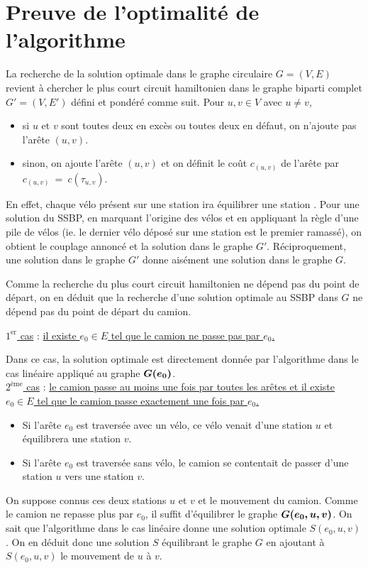 \section{Preuve de l'optimalité de l'algorithme}
\label{Capicité unitaire preuve}

La recherche de la solution optimale dans le graphe circulaire $G=(V,E)$ revient à chercher le plus court circuit hamiltonien dans le graphe biparti complet $G'=(V,E')$ défini et pondéré comme suit. Pour $u,v \in V$ avec $u \ne v$,
\begin{itemize}
\item si $u$ et $v$ sont toutes deux en excès ou toutes deux en défaut, on n'ajoute pas l'arête $(u,v)$.
\item sinon, on ajoute l'arête $(u,v)$ et on définit le coût $c_{(u,v)}$ de l'arête par $c_{(u,v)}~=~c(\tau_{u,v})$.
\end{itemize}
En effet, chaque vélo présent sur une station \plus ira équilibrer une station \moins. Pour une solution du SSBP, en marquant l'origine des vélos et en appliquant la règle d'une pile de vélos (ie. le dernier vélo déposé sur une station est le premier ramassé), on obtient le couplage annoncé et la solution dans le graphe $G'$. Réciproquement, une solution dans le graphe $G'$ donne aisément une solution dans le graphe $G$.

Comme la recherche du plus court circuit hamiltonien ne dépend pas du point de départ, on en déduit que la recherche d'une solution optimale au SSBP dans $G$ ne dépend pas du point de départ du camion.

\uline{$1^{\mbox{er}}$ cas} : \uline{il existe $e_0 \in E$ tel que le camion ne passe pas par $e_0$.}

Dans ce cas, la solution optimale est directement donnée par l'algorithme dans le cas linéaire appliqué au graphe $\boldsymbol{G(e_0)}$.
\\

\uline{$2^{\mbox{ème}}$ cas} : \uline{le camion passe au moins une fois par toutes les arêtes et il existe $e_0 \in E$ tel que le camion passe exactement une fois par $e_0$.}

\begin{itemize}
\item Si l'arête $e_0$ est traversée avec un vélo, ce vélo venait d'une station \plus $u$ et équilibrera une station \moins $v$.
\item Si l'arête $e_0$ est traversée sans vélo, le camion se contentait de passer d'une station \moins $u$ vers une station \plus $v$.
\end{itemize}
On suppose connus ces deux stations $u$ et $v$ et le mouvement du camion. Comme le camion ne repasse plus par $e_0$, il suffit d'équilibrer le graphe $\boldsymbol{G(e_0,u,v)}$. On sait que l'algorithme dans le cas linéaire donne une solution optimale $S(e_0,u,v)$. On en déduit donc une solution $S$ équilibrant le graphe $G$ en ajoutant à $S(e_0,u,v)$ le mouvement de $u$ à $v$.
\\

